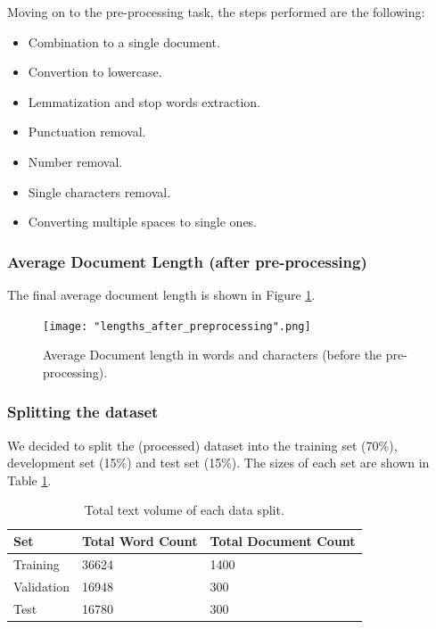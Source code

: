 \documentclass[10pt, a4paper]{article}
\begin{document}
    Moving on to the pre-processing task, the steps performed are the following:
    \begin{itemize}
        \item{ Combination to a single document.}
        \item{ Convertion to lowercase.}
        \item{Lemmatization and stop words extraction.}
        \item{ Punctuation removal.}
        \item{ Number removal.}
         \item{Single characters removal.}
        \item{ Converting multiple spaces to single ones.}
    \end{itemize}

    \subsubsection{Average Document Length (after pre-processing)}
    The final average document length is shown in Figure \ref{fig::after_preprocess}.

    \begin{figure}
	    \centering
            \texttt{[image: "lengths\_after\_preprocessing".png]}
	    \caption{Average Document length in words and characters (before the pre-processing).}
	    \label{fig::after_preprocess}
    \end{figure}

    \subsubsection{Splitting the dataset}
    We decided to split the (processed) dataset into the training set (70\%), development set (15\%) and test set (15\%). The sizes of each set are shown in Table \ref{tab::ex-9-stats}.

    \begin{table}
		\begin{tabular}{|l|l|l|}
			\hline
			\cellcolor{blue!25}\textbf{Set} & \cellcolor{blue!25}\textbf{Total Word Count} &
			\cellcolor{blue!25}\textbf{Total Document Count}\\
			\hline
			Training & 36624 & 1400 \\\hline
			Validation & 16948  & 300 \\\hline
			Test & 16780 & 300 \\\hline
		\end{tabular}
		\centering
		\caption{Total text volume of each data split.}
		\label{tab::ex-9-stats}
	\end{table}
    
\end{document}
